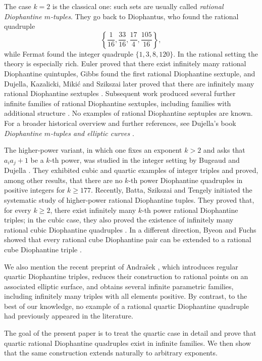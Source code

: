 \documentclass[11pt]{article}
\begin{document}
The case $k=2$ is the classical one: such sets are usually called \emph{rational Diophantine $m$-tuples}. They go back to Diophantus, who found the rational quadruple
\[
\left\{\frac1{16},\frac{33}{16},\frac{17}{4},\frac{105}{16}\right\},
\]
while Fermat found the integer quadruple $\{1,3,8,120\}$. In the rational setting the theory is especially rich. Euler proved that there exist infinitely many rational Diophantine quintuples, Gibbs found the first rational Diophantine sextuple, and Dujella, Kazalicki, Miki\'c and Szikszai later proved that there are infinitely many rational Diophantine sextuples \cite{DKMS}. Subsequent work produced several further infinite families of rational Diophantine sextuples, including families with additional structure \cite{DK,DKP-sq,DKP-strong}. No examples of rational Diophantine septuples are known. For a broader historical overview and further references, see Dujella's book \emph{Diophantine $m$-tuples and elliptic curves} \cite{DujellaBook}.

The higher-power variant, in which one fixes an exponent \(k>2\) and asks
that \(a_i a_j+1\) be a \(k\)-th power, was studied in the integer setting by
Bugeaud and Dujella \cite{BD}. They exhibited cubic and quartic examples of
integer triples and proved, among other results, that there are no \(k\)-th
power Diophantine quadruples in positive integers for \(k\ge 177\). Recently,
Batta, Szikszai and Tengely initiated the systematic study of higher-power
rational Diophantine tuples. They proved that, for every \(k\ge 2\), there
exist infinitely many \(k\)-th power rational Diophantine triples; in the
cubic case, they also proved the existence of infinitely many rational cubic
Diophantine quadruples \cite{BST}. In a different direction, Byeon and Fuchs
showed that every rational cube Diophantine pair can be extended to a rational
cube Diophantine triple \cite{BF}.

We also mention the recent preprint of Andra\v{s}ek \cite{Andrasek}, which
introduces regular quartic Diophantine triples, reduces their construction to
rational points on an associated elliptic surface, and obtains several infinite
parametric families, including infinitely many triples with all elements
positive. By contrast, to the best of our knowledge, no example of
a rational quartic Diophantine quadruple had previously appeared in the
literature.

The goal of the present paper is to treat the quartic case in detail and prove that quartic rational Diophantine quadruples exist in infinite families. We then show that the same construction extends naturally to arbitrary exponents.
\end{document}
